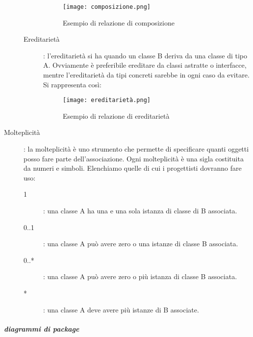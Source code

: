 \documentclass[../../norme-di-progetto.tex]{subfiles}
\begin{document}
\begin{description}
\begin{description}
\begin{figure}[H]
      \texttt{[image: composizione.png]}
      \centering
      \caption{Esempio di relazione di composizione}
    \end{figure}
    \item [Ereditarietà]: l'ereditarietà si ha quando un classe B deriva da una classe di tipo A. Ovviamente è preferibile ereditare da classi astratte o interfacce, mentre l'ereditarietà da tipi concreti sarebbe in ogni caso da evitare. Si rappresenta così:
    \begin{figure}[H]%
      \label{fig:ereditarieta}
      \texttt{[image: ereditarietà.png]}
      \centering
      \caption{Esempio di relazione di ereditarietà}
    \end{figure}
  \end{description}
  \item [Molteplicità]: la molteplicità è uno strumento che permette di specificare quanti oggetti posso fare parte dell'associazione. Ogni molteplicità è una sigla costituita da numeri e simboli. Elenchiamo quelle di cui i progettisti dovranno fare uso:
  \begin{description}
    \item [1]: una classe A ha una e una sola istanza di classe di B associata.
    \item [0..1]: una classe A può avere zero o una istanze di classe B associata.
    \item [0..*]: una classe A può avere zero o più istanza di classe B associata.
    \item [*]: una classe A deve avere più istanze di B associate.
  \end{description}
\end{description}

\subparagraph{diagrammi di package}%
\label{subp:diagrammi_di_package}
\end{document}
